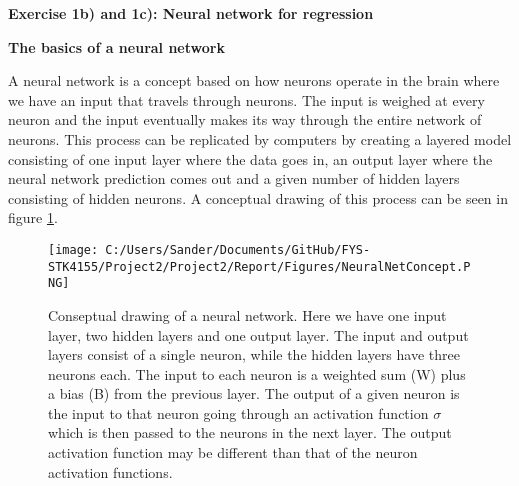 \documentclass[12pt,a4paper]{article}
\begin{document}
\newpage

\begin{center}
\Large{\textbf{Exercise 1b) and 1c): Neural network for regression}}
\end{center}

\begin{center}
\large{\textbf{The basics of a neural network}}
\end{center}

\noindent A neural network is a concept based on how neurons operate in the brain where we have an input that travels through neurons. The input is weighed at every neuron and the input eventually makes its way through the entire network of neurons. This process can be replicated by computers by creating a layered model consisting of one input layer where the data goes in, an output layer where the neural network prediction comes out and a given number of hidden layers consisting of hidden neurons. A conceptual drawing of this process can be seen in figure \ref{fig:nnconcept}.

\begin{figure}[H]
\centering
\texttt{[image: C:/Users/Sander/Documents/GitHub/FYS-STK4155/Project2/Project2/Report/Figures/NeuralNetConcept.PNG]}
\caption{\label{fig:nnconcept} Conseptual drawing of a neural network. Here we have one input layer, two hidden layers and one output layer. The input and output layers consist of a single neuron, while the hidden layers have three neurons each. The input to each neuron is a weighted sum (W) plus a bias (B) from the previous layer. The output of a given neuron is the input to that neuron going through an activation function $\sigma$ which is then passed to the neurons in the next layer. The output activation function may be different than that of the neuron activation functions.}
\end{figure}
\end{document}
